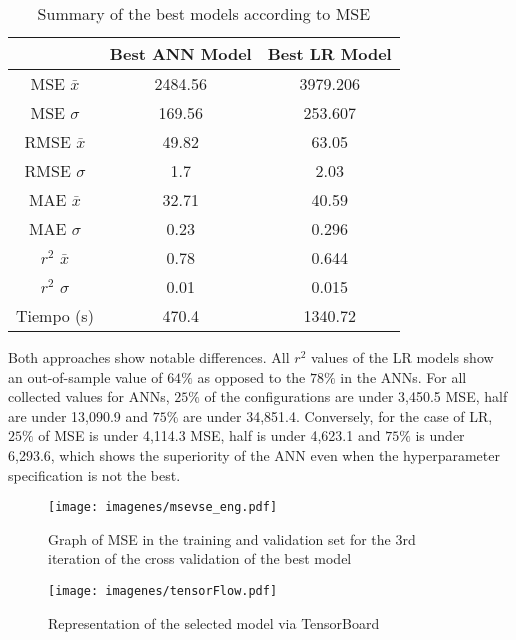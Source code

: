 \documentclass[conference]{IEEEtran}
\begin{document}
\begin{table}[!ht]
\renewcommand{\arraystretch}{1.3}
\caption{Summary of the best models according to MSE}
\label{table7}
\centering
\begin{tabular}{c || c || c }
\hline
\bfseries 		 & \bfseries  Best ANN Model		& \bfseries Best LR Model \\

\hline\hline

MSE $\bar{x}$         &    ﻿2484.56     &     ﻿3979.206     \\
MSE $\sigma$         &    169.56     &     253.607     \\
RMSE $\bar{x}$         &    49.82     &     63.05     \\
RMSE $\sigma$        &    1.7     &     2.03     \\
MAE $\bar{x}$         &    32.71     &     40.59     \\
MAE $\sigma$         &    0.23     &     0.296     \\
$r^{2}$ $\bar{x}$         &    0.78     &     0.644     \\
$r^{2}$ $\sigma$         &    0.01     &     0.015     \\
Tiempo (s)      &    470.4     &     ﻿1340.72     \\

\hline
\end{tabular}
\end{table}

Both approaches show notable differences. All $r^2$ values of the LR models show an out-of-sample value of $64\%$ as opposed to the $78\%$ in the ANNs. For all collected values for ANNs, $25\%$ of the configurations are under 3,450.5 MSE, half are under 13,090.9 and $75\%$ are under 34,851.4. Conversely, for the case of LR, $25\%$ of MSE is under 4,114.3 MSE, half is under 4,623.1 and $75\%$ is under 6,293.6, which shows the superiority of the ANN even when the hyperparameter specification is not the best.

\begin{figure}[!htbp]
\centerline{\texttt{[image: imagenes/msevse\_eng.pdf]}}
\caption{Graph of MSE in the training and validation set for the 3rd iteration of the cross validation of the best model}
\label{fig9}
\end{figure}

\begin{figure}[!htbp]
\centerline{\texttt{[image: imagenes/tensorFlow.pdf]}}
\caption{Representation of the selected model via TensorBoard}
\label{fig8}
\end{figure}
\end{document}
